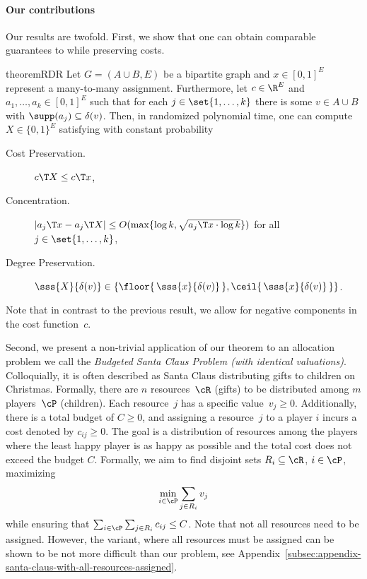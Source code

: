 \paragraph*{Our contributions}
Our results are twofold.
First, we show that one can obtain comparable guarantees to  while preserving costs. 
\begin{restatable}{theorem}{RDR}
    \label{thm:assign}
    Let $G = (A\cup B, E)$ be a bipartite graph and
    $x\in [0, 1]^{E}$ represent a many-to-many assignment.
    Furthermore, let $c\in\R^{E}$ and $a_1,\dotsc,a_k\in [0, 1]^E$ such
    that for each $j \in \set{1,\dotsc,k}$ there is some $v\in A\cup B$
    with $\supp(a_j) \subseteq \delta(v)$.
    Then, in randomized polynomial time, one can compute
    $X\in \{0, 1\}^E$ satisfying with constant probability
    \begin{description}
        \item[Cost Preservation.] \hspace{0.46cm} $c\T X \le c\T x$,
        \item[Concentration.] \hspace{1.03cm} $|a_j\T x - a_j\T X| \le
            O(\max\{\log k, \sqrt{a_j\T x \cdot \log k}\})$ for all $j\in \set{1,\dotsc,k}$,
        \item[Degree Preservation.] \hspace{0.05cm} $\sss{X}{\delta(v)} \in \{\floor{\, \sss{x}{\delta(v)} \,}, \ceil{\, \sss{x}{\delta(v)} \,} \}$.
    \end{description}
\end{restatable}
\medskip \noindent Note that in contrast to the previous result, we allow for negative components in the cost function~$c$.

Second, we present a non-trivial application of our theorem to an allocation problem we call the \emph{Budgeted Santa Claus Problem (with identical valuations)}.
Colloquially, it is often described as Santa Claus distributing gifts to children on Christmas.
Formally, there are $n$ resources~$\cR$ (gifts) to be distributed among $m$ players~$\cP$ (children). 
Each resource~$j$ has a specific value~$v_j \ge 0$.
Additionally, there is a total budget of $C \ge 0$, and assigning a resource~$j$ to a player $i$ incurs
a cost denoted by $c_{ij} \ge 0$. 
The goal is a distribution of resources among the players where the least happy player is as happy as possible and
the total cost does not exceed the budget $C$. 
Formally, we aim to find disjoint sets $R_i\subseteq \cR $, $i\in \cP$, maximizing 
\begin{equation*}
    \min_{i\in\cP} \sum_{j \in R_i} v_{j}
\end{equation*}
while ensuring that $\sum_{i\in\cP }^{}\sum_{j\in R_i}^{} c_{ij} \leq C$.
Note that not all resources need to be assigned. However, the variant, where all resources must be assigned can be shown to be 
not more difficult than our problem, see Appendix~\ref{subsec:appendix-santa-claus-with-all-resources-assigned}.


